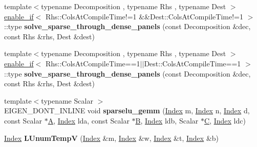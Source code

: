 \begin{DoxyCompactItemize}
{\footnotesize template$<$typename Decomposition , typename Rhs , typename Dest $>$ }\\\hyperlink{struct_eigen_1_1internal_1_1enable__if}{enable\+\_\+if}$<$ Rhs\+::\+Cols\+At\+Compile\+Time!=1 \&\&Dest\+::\+Cols\+At\+Compile\+Time!=1 $>$\+::type {\bfseries solve\+\_\+sparse\+\_\+through\+\_\+dense\+\_\+panels} (const Decomposition \&dec, const Rhs \&rhs, Dest \&dest)
\item 
\mbox{\label{namespace_eigen_1_1internal_aef46b79d3f0d993e461160f5164ef5f5}} 
{\footnotesize template$<$typename Decomposition , typename Rhs , typename Dest $>$ }\\\hyperlink{struct_eigen_1_1internal_1_1enable__if}{enable\+\_\+if}$<$ Rhs\+::\+Cols\+At\+Compile\+Time==1$\vert$$\vert$Dest\+::\+Cols\+At\+Compile\+Time==1 $>$\+::type {\bfseries solve\+\_\+sparse\+\_\+through\+\_\+dense\+\_\+panels} (const Decomposition \&dec, const Rhs \&rhs, Dest \&dest)
\item 
\mbox{\label{namespace_eigen_1_1internal_a32f426c047271d8068ce90f72ff64632}} 
{\footnotesize template$<$typename Scalar $>$ }\\E\+I\+G\+E\+N\+\_\+\+D\+O\+N\+T\+\_\+\+I\+N\+L\+I\+NE void {\bfseries sparselu\+\_\+gemm} (\hyperlink{namespace_eigen_a62e77e0933482dafde8fe197d9a2cfde}{Index} m, \hyperlink{namespace_eigen_a62e77e0933482dafde8fe197d9a2cfde}{Index} n, \hyperlink{namespace_eigen_a62e77e0933482dafde8fe197d9a2cfde}{Index} d, const Scalar $\ast$\hyperlink{group___core___module_class_eigen_1_1_matrix}{A}, \hyperlink{namespace_eigen_a62e77e0933482dafde8fe197d9a2cfde}{Index} lda, const Scalar $\ast$\hyperlink{group___core___module_class_eigen_1_1_matrix}{B}, \hyperlink{namespace_eigen_a62e77e0933482dafde8fe197d9a2cfde}{Index} ldb, Scalar $\ast$\hyperlink{group___core___module}{C}, \hyperlink{namespace_eigen_a62e77e0933482dafde8fe197d9a2cfde}{Index} ldc)
\item 
\mbox{\label{namespace_eigen_1_1internal_a06f46a81823c2cad7049491f40de06e6}} 
\hyperlink{namespace_eigen_a62e77e0933482dafde8fe197d9a2cfde}{Index} {\bfseries L\+Unum\+TempV} (\hyperlink{namespace_eigen_a62e77e0933482dafde8fe197d9a2cfde}{Index} \&m, \hyperlink{namespace_eigen_a62e77e0933482dafde8fe197d9a2cfde}{Index} \&w, \hyperlink{namespace_eigen_a62e77e0933482dafde8fe197d9a2cfde}{Index} \&t, \hyperlink{namespace_eigen_a62e77e0933482dafde8fe197d9a2cfde}{Index} \&b)
$$
\end{DoxyCompactItemize}
